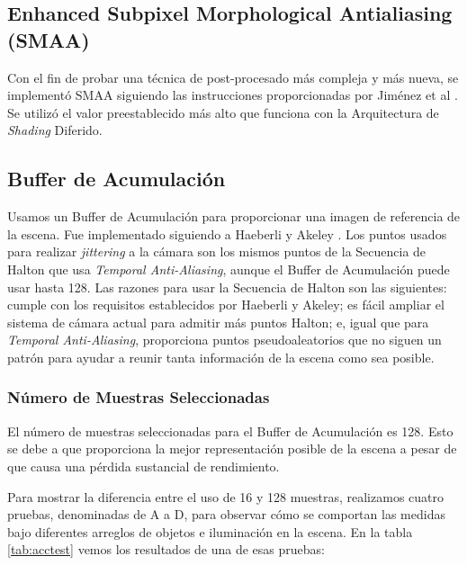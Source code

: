 \documentclass[pregrado]{tesis-usb} %
\begin{document}
\subsection{Enhanced Subpixel Morphological Antialiasing (SMAA)}
Con el fin de probar una técnica de post-procesado más compleja y más nueva, se implementó SMAA siguiendo las instrucciones proporcionadas por Jiménez et al \cite{Jimenez2012}. Se utilizó el valor preestablecido más alto que funciona con la Arquitectura de \textit{Shading} Diferido.

\subsection{Buffer de Acumulación}
Usamos un Buffer de Acumulación para proporcionar una imagen de referencia de la escena. Fue implementado siguiendo a Haeberli y Akeley \cite{Haeberli1990}. Los puntos usados para realizar \textit{jittering} a la cámara son los mismos puntos de la Secuencia de Halton que usa \textit{Temporal Anti-Aliasing}, aunque el Buffer de Acumulación puede usar hasta 128. Las razones para usar la Secuencia de Halton son las siguientes: cumple con los requisitos establecidos por Haeberli y Akeley; es fácil ampliar el sistema de cámara actual para admitir más puntos Halton; e, igual que para \textit{Temporal Anti-Aliasing}, proporciona puntos pseudoaleatorios que no siguen un patrón para ayudar a reunir tanta información de la escena como sea posible.

\subsubsection{Número de Muestras Seleccionadas}
El número de muestras seleccionadas para el Buffer de Acumulación es 128. Esto se debe a que proporciona la mejor representación posible de la escena a pesar de que causa una pérdida sustancial de rendimiento.

Para mostrar la diferencia entre el uso de 16 y 128 muestras, realizamos cuatro pruebas, denominadas de A a D, para observar cómo se comportan las medidas bajo diferentes arreglos de objetos e iluminación en la escena. En la tabla \ref{tab:acctest} vemos los resultados de una de esas pruebas:
\end{document}
